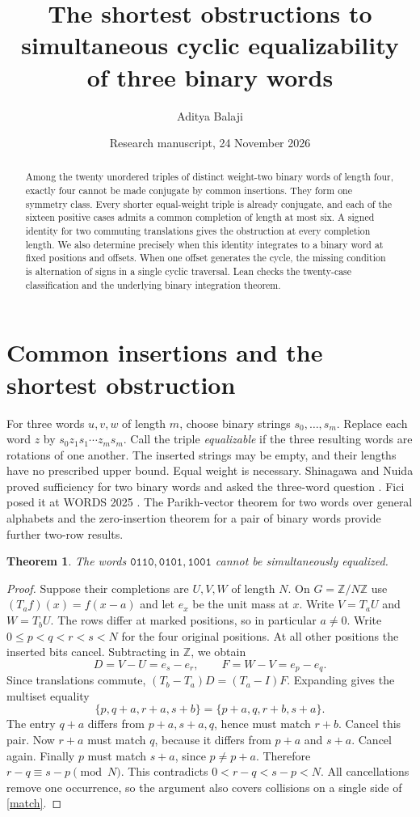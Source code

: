 \documentclass[11pt]{article}
\title{The shortest obstructions to simultaneous cyclic equalizability of three binary words}
\author{Aditya Balaji}
\date{Research manuscript, 24 November 2026}
\newtheorem{theorem}{Theorem}[section]
\newcommand{\Z}{\mathbb Z}
\newcommand{\w}[1]{\texttt{#1}}
\begin{document}
\maketitle
\begin{abstract}
Among the twenty unordered triples of distinct weight-two binary words of length four, exactly four cannot be made conjugate by common insertions. They form one symmetry class. Every shorter equal-weight triple is already conjugate, and each of the sixteen positive cases admits a common completion of length at most six. A signed identity for two commuting translations gives the obstruction at every completion length. We also determine precisely when this identity integrates to a binary word at fixed positions and offsets. When one offset generates the cycle, the missing condition is alternation of signs in a single cyclic traversal. Lean checks the twenty-case classification and the underlying binary integration theorem.
\end{abstract}

\section{Common insertions and the shortest obstruction}
For three words $u,v,w$ of length $m$, choose binary strings $s_0,\ldots,s_m$. Replace each word $z$ by $s_0z_1s_1\cdots z_ms_m$. Call the triple \emph{equalizable} if the three resulting words are rotations of one another. The inserted strings may be empty, and their lengths have no prescribed upper bound. Equal weight is necessary. Shinagawa and Nuida proved sufficiency for two binary words and asked the three-word question \cite{sn}. Fici posed it at WORDS 2025 \cite{words}. The Parikh-vector theorem for two words over general alphabets \cite{tpr} and the zero-insertion theorem for a pair of binary words \cite{t} provide further two-row results.

\begin{theorem}\label{bad}
The words $\w{0110},\w{0101},\w{1001}$ cannot be simultaneously equalized.
\end{theorem}
\begin{proof}
Suppose their completions are $U,V,W$ of length $N$. On $G=\Z/N\Z$ use $(T_af)(x)=f(x-a)$ and let $e_x$ be the unit mass at $x$. Write $V=T_aU$ and $W=T_bU$. The rows differ at marked positions, so in particular $a\ne0$. Write $0\le p<q<r<s<N$ for the four original positions. At all other positions the inserted bits cancel. Subtracting in $\Z$, we obtain
\[
D=V-U=e_s-e_r,\qquad F=W-V=e_p-e_q.
\]
Since translations commute, $(T_b-T_a)D=(T_a-I)F$. Expanding gives the multiset equality
\begin{equation}\label{match}
 \{p,q+a,r+a,s+b\}=\{p+a,q,r+b,s+a\}.
\end{equation}
The entry $q+a$ differs from $p+a,s+a,q$, hence must match $r+b$. Cancel this pair. Now $r+a$ must match $q$, because it differs from $p+a$ and $s+a$. Cancel again. Finally $p$ must match $s+a$, since $p\ne p+a$. Therefore $r-q\equiv s-p\pmod N$. This contradicts $0<r-q<s-p<N$. All cancellations remove one occurrence, so the argument also covers collisions on a single side of \eqref{match}.
\end{proof}
\end{document}
